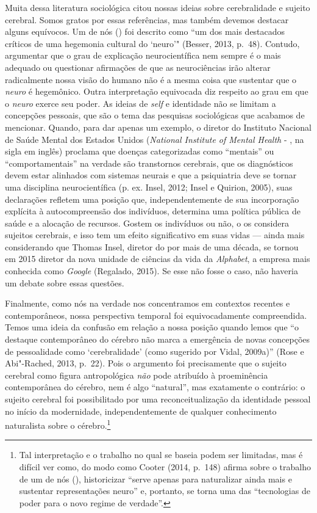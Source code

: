 Muita dessa literatura sociológica citou nossas ideias sobre
cerebralidade e sujeito cerebral. Somos gratos por essas referências,
mas também devemos destacar alguns equívocos. Um de nós () foi
descrito como ``um dos mais destacados críticos de uma hegemonia
cultural do `neuro'" (Besser, 2013, p.~48). Contudo, argumentar que o
grau de explicação neurocientífica nem sempre é o mais adequado ou
questionar afirmações de que as neurociências irão alterar radicalmente
nossa visão do humano não é a mesma coisa que sustentar que o
\emph{neuro} é hegemônico. Outra interpretação equivocada diz respeito
ao grau em que o \emph{neuro} exerce seu poder. As ideias de \emph{self} e
identidade não se limitam a concepções pessoais, que são o tema das
pesquisas sociológicas que acabamos de mencionar. Quando, para dar
apenas um exemplo, o diretor do Instituto Nacional de Saúde Mental dos
Estados Unidos (\emph{National Institute of Mental Health} - , na
sigla em inglês) proclama que doenças categorizadas como ``mentais'' ou
``comportamentais'' na verdade são transtornos cerebrais, que os
diagnósticos devem estar alinhados com sistemas neurais e que a
psiquiatria deve se tornar uma disciplina neurocientífica (p. ex. Insel,
2012; Insel e Quirion, 2005), suas declarações refletem uma posição que,
independentemente de sua incorporação explícita à autocompreensão dos
indivíduos, determina uma política pública de saúde e a alocação de
recursos. Gostem os indivíduos ou não, o  os considera sujeitos
cerebrais, e isso tem um efeito significativo em suas vidas --- ainda
mais considerando que Thomas Insel, diretor do  por mais de uma
década, se tornou em 2015 diretor da nova unidade de ciências da vida
da \emph{Alphabet}, a empresa mais conhecida como \emph{Google}
(Regalado, 2015). Se esse não fosse o caso, não haveria um debate sobre
essas questões.

Finalmente, como nós na verdade nos concentramos em contextos recentes e
contemporâneos, nossa perspectiva temporal foi equivocadamente
compreendida. Temos uma ideia da confusão em relação a nossa posição
quando lemos que ``o destaque contemporâneo do cérebro não marca a
emergência de novas concepções de pessoalidade como `cerebralidade'
(como sugerido por Vidal, 2009a)'' (Rose e Abi"-Rached, 2013, p.~22). Pois
o argumento foi precisamente que o sujeito cerebral como figura
antropológica \emph{não} pode atribuído à proeminência contemporânea do
cérebro, nem é algo ``natural'', mas exatamente o contrário: o sujeito
cerebral foi possibilitado por uma reconceitualização da identidade
pessoal no início da modernidade, independentemente de qualquer
conhecimento naturalista sobre o cérebro.\footnote[5]{Tal interpretação e o trabalho no qual se baseia podem ser
limitadas, mas é difícil ver como, do modo como Cooter (2014, p.~148)
afirma sobre o trabalho de um de nós (), historicizar ``serve apenas
para naturalizar ainda mais e sustentar representações neuro'' e,
portanto, se torna uma das ``tecnologias de poder para o novo regime de
verdade''.}

